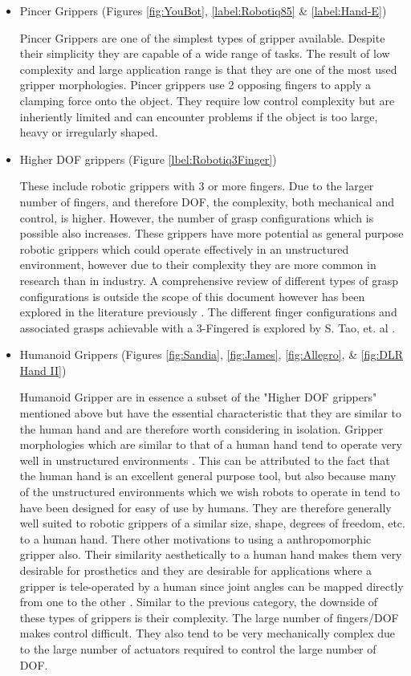 \begin{itemize}
    \item Pincer Grippers (Figures \ref{fig:YouBot}, \ref{label:Robotiq85} \& \ref{label:Hand-E})
    
    Pincer Grippers are one of the simplest types of gripper available. Despite their simplicity they are capable of a wide range of tasks. The result of low complexity and large application range is that they are one of the most used gripper morphologies. Pincer grippers use 2 opposing fingers to apply a clamping force onto the object. They require low control complexity but are inheriently limited and can encounter problems if the object is too large, heavy or irregularly shaped.
    
    \item Higher DOF  grippers (Figure \ref{lbel:Robotiq3Finger})
    
    These include robotic grippers with 3 or more fingers. Due to the larger number of fingers, and therefore DOF, the complexity, both mechanical and control, is higher. However, the number of grasp configurations which is possible also increases. These grippers have more potential as general purpose robotic grippers which could operate effectively in an unstructured environment, however due to their complexity they are more common in research than in industry. A comprehensive review of different types of grasp configurations is outside the scope of this document however has been explored in the literature previously \cite{GRASPTaxonomy}. The different finger configurations and associated grasps achievable with a 3-Fingered is explored by S. Tao, et. al \cite{Reconf3Finger}.
    
    
    \item Humanoid Grippers (Figures \ref{fig:Sandia}, \ref{fig:James}, \ref{fig:Allegro}, \& \ref{fig:DLR Hand II})
    
    Humanoid Gripper are in essence a subset of the "Higher DOF grippers" mentioned above but have the essential characteristic that they are similar to the human hand and are therefore worth considering in isolation. Gripper morphologies which are similar to that of a human hand tend to operate very well in unstructured environments \cite{pneumaticAnthropomorphicHand,Mahmoud2010}. 
    This can be attributed to the fact that the human hand is an excellent general purpose tool, but also because many of the unstructured environments which we wish robots to operate in tend to have been designed for easy of use by humans. They are therefore generally well suited to robotic grippers of a similar size, shape, degrees of freedom, etc. to a human hand. There other motivations to using a anthropomorphic gripper also. Their similarity aesthetically to a human hand makes them very desirable for prosthetics and they are desirable for applications where a gripper is tele-operated by a human since joint angles can be mapped directly from one to the other \cite{AnthroHandReview}. Similar to the previous category, the downside of these types of grippers is their complexity. The large number of fingers/DOF makes control difficult. They also tend to be very mechanically complex due to the large number of actuators required to control the large number of DOF.
    

\end{itemize}
